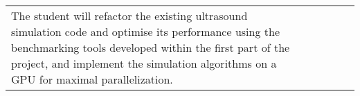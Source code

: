 \begin{center}
{\begin{tabular}{|p{16mm}|p{33mm}|p{28mm}|p{18mm}|p{18mm}|p{67mm}|}
{%
The student will refactor the existing ultrasound simulation code and optimise its performance using 
the benchmarking tools developed within the first part of the project, and 
implement the simulation algorithms on a GPU for maximal parallelization. 
}
\end{tabular}}
\end{center}
